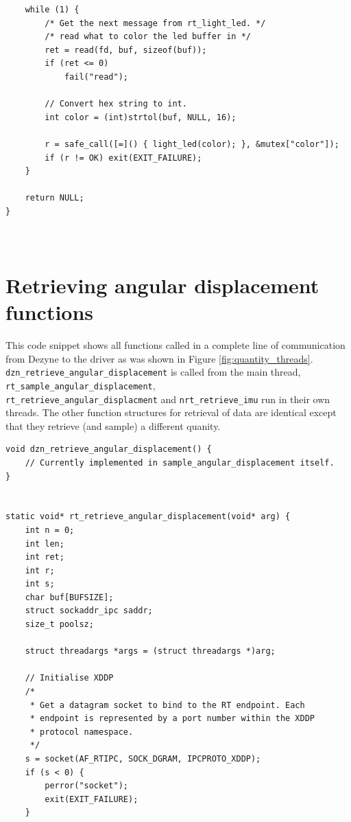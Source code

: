 \documentclass[12pt]{scrreprt}
\begin{document}
\begin{appendices}
\begin{verbatim}
    while (1) {
        /* Get the next message from rt_light_led. */
        /* read what to color the led buffer in */
        ret = read(fd, buf, sizeof(buf));
        if (ret <= 0)
            fail("read");

        // Convert hex string to int.
        int color = (int)strtol(buf, NULL, 16);

        r = safe_call([=]() { light_led(color); }, &mutex["color"]);
        if (r != OK) exit(EXIT_FAILURE);
    }

    return NULL;
}



\end{verbatim}

\section{Retrieving angular displacement functions}
This code snippet shows all functions called in a complete line of communication from Dezyne to the driver as was shown in Figure \ref{fig:quantity_threads}. \texttt{dzn\_retrieve\_angular\_displacement} is called from the main thread, \texttt{rt\_sample\_angular\_displacement},\\\texttt{rt\_retrieve\_angular\_displacment} and \texttt{nrt\_retrieve\_imu} run in their own threads. The other function structures for retrieval of data are identical except that they retrieve (and sample) a different quanity.

\begin{verbatim}
void dzn_retrieve_angular_displacement() {
    // Currently implemented in sample_angular_displacement itself.
}


static void* rt_retrieve_angular_displacement(void* arg) {
    int n = 0;
    int len;
    int ret;
    int r;
    int s;
    char buf[BUFSIZE];
    struct sockaddr_ipc saddr;
    size_t poolsz;

    struct threadargs *args = (struct threadargs *)arg;

    // Initialise XDDP
    /*
     * Get a datagram socket to bind to the RT endpoint. Each
     * endpoint is represented by a port number within the XDDP
     * protocol namespace.
     */
    s = socket(AF_RTIPC, SOCK_DGRAM, IPCPROTO_XDDP);
    if (s < 0) {
        perror("socket");
        exit(EXIT_FAILURE);
    }


\end{verbatim}
\end{appendices}
\end{document}
